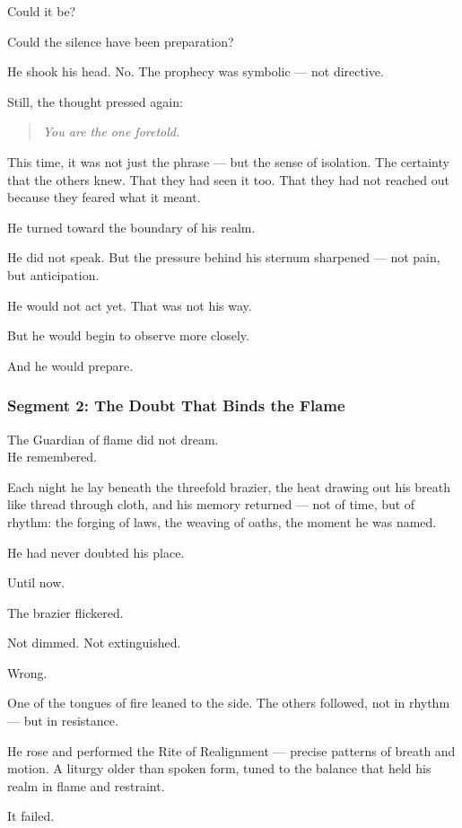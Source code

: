 \documentclass[9pt]{article}
\begin{document}
Could it be?

Could the silence have been preparation?

He shook his head. No. The prophecy was symbolic — not directive.

Still, the thought pressed again:

\begin{quote}
\emph{You are the one foretold.}
\end{quote}

This time, it was not just the phrase — but the sense of isolation. The certainty that the others knew. That they had seen it too. That they had not reached out because they feared what it meant.

He turned toward the boundary of his realm.

He did not speak. But the pressure behind his sternum sharpened — not pain, but anticipation.

He would not act yet. That was not his way.

But he would begin to observe more closely.

And he would prepare.


\newpage

\subsubsection*{Segment 2: The Doubt That Binds the Flame}

The Guardian of flame did not dream.\\
He remembered.

Each night he lay beneath the threefold brazier, the heat drawing out his breath like thread through cloth, and his memory returned — not of time, but of rhythm: the forging of laws, the weaving of oaths, the moment he was named.

He had never doubted his place.

Until now.

The brazier flickered.

Not dimmed. Not extinguished.

Wrong.

One of the tongues of fire leaned to the side. The others followed, not in rhythm — but in resistance.

He rose and performed the Rite of Realignment — precise patterns of breath and motion. A liturgy older than spoken form, tuned to the balance that held his realm in flame and restraint.

It failed.
\end{document}
